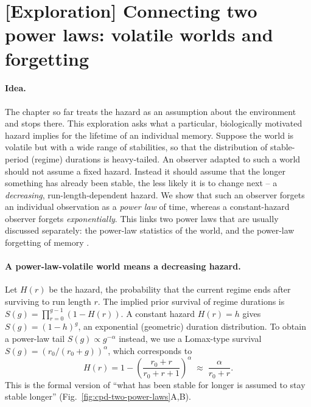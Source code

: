 %

\section*{[Exploration] Connecting two power laws: volatile worlds and forgetting}

\paragraph{Idea.}
The chapter so far treats the hazard as an assumption about the
environment and stops there. This exploration asks what a particular,
biologically motivated hazard implies for the lifetime of an individual
memory. Suppose the world is volatile but with a wide range of
stabilities, so that the distribution of stable-period (regime)
durations is heavy-tailed. An observer adapted to such a world should
not assume a fixed hazard. Instead it should assume that the longer
something has already been stable, the less likely it is to change next
-- a \emph{decreasing}, run-length-dependent hazard. We show that such an
observer forgets an individual observation as a \emph{power law} of time,
whereas a constant-hazard observer forgets \emph{exponentially}. This
links two power laws that are usually discussed separately: the
power-law statistics of the world, and the power-law forgetting of
memory \citep{AndersonSchooler1991, Wixted2004}.

\paragraph{A power-law-volatile world means a decreasing hazard.}
Let $H(r)$ be the hazard, the probability that the current regime ends
after surviving to run length $r$. The implied prior survival of regime
durations is $S(g) = \prod_{r=0}^{g-1}(1-H(r))$. A constant hazard
$H(r)=h$ gives $S(g)=(1-h)^g$, an exponential (geometric) duration
distribution. To obtain a power-law tail $S(g)\propto g^{-\alpha}$
instead, we use a Lomax-type survival $S(g)=(r_0/(r_0+g))^{\alpha}$,
which corresponds to
\begin{equation}
    H(r) = 1 - \left(\frac{r_0+r}{r_0+r+1}\right)^{\alpha}
    \;\approx\; \frac{\alpha}{r_0+r}.
\end{equation}
This is the formal version of ``what has been stable for longer is
assumed to stay stable longer'' (Fig.~\ref{fig:cpd-two-power-laws}A,B).

